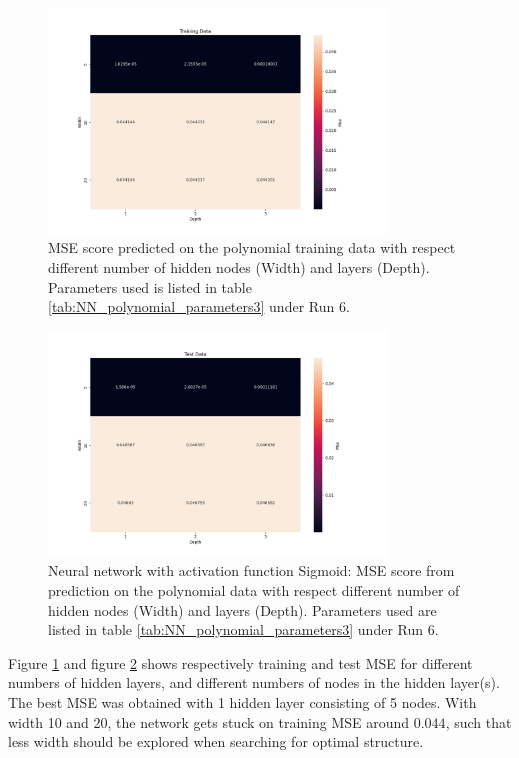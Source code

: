 \begin{figure}[H]
    \centering
    \includegraphics[width=0.8\textwidth]{Figures/PartB/heatmap_train_polydata_width_vs_depth.png}
    \caption{MSE score predicted on the polynomial training data with respect
    different number of hidden nodes (Width) and layers (Depth). Parameters
used is listed in table \ref{tab:NN_polynomial_parameters3} under Run 6.}  
    \label{fig:polydata_train_width_vs_depth} 

\end{figure}

\begin{figure}[H]
    \centering
    \includegraphics[width=0.8\textwidth]{Figures/PartB/heatmap_test_polydata_width_vs_depth.png}
    \caption{Neural network with activation function Sigmoid: MSE score from prediction on the polynomial data with respect
    different number of hidden nodes (Width) and layers (Depth). Parameters
used are listed in table \ref{tab:NN_polynomial_parameters3} under Run 6.}  
    \label{fig:polydata_test_width_vs_depth} 
\end{figure}


Figure \ref{fig:polydata_train_width_vs_depth} and figure \ref{fig:polydata_test_width_vs_depth} shows 
respectively training and test MSE for different numbers of hidden layers, and different numbers of 
nodes in the hidden layer(s). The best MSE was obtained 
with 1 hidden layer consisting of 5 nodes. With width 10 and 20, the network gets stuck on training MSE around
$0.044$, such that less width should be explored when searching for optimal structure.   

